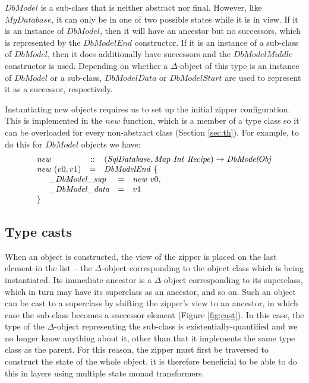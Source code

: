 $\mathit{DbModel}$ is a sub-class that is neither abstract nor final. However, like $\mathit{MyDatabase}$, it can only be in one of two possible states while it is in view. If it is an instance of $\mathit{DbModel}$, then it will have an ancestor but no successors, which is represented by the $\mathit{DbModelEnd}$ constructor. If it is an instance of a sub-class of $\mathit{DbModel}$, then it does additionally have successors and the $\mathit{DbModelMiddle}$ constructor is used. Depending on whether a $\Delta$-object of this type is an instance of $\mathit{DbModel}$ or a sub-class, $\mathit{DbModelData}$ or $\mathit{DbModelStart}$ are used to represent it as a successor, respectively.

Instantiating new objects requires us to set up the initial zipper configuration. This is implemented in the $\mathit{new}$ function, which is a member of a type class so it can be overloaded for every non-abstract class (Section \ref{sec:th}). For example, to do this for $\mathit{DbModel}$ objects we have:
\begin{displaymath}
\begin{array}{lcl}
\mathit{new} & :: & (\mathit{SqlDatabase}, \mathit{Map}~\mathit{Int}~\mathit{Recipe}) \to 
\mathit{DbModelObj} \\
\mathit{new}~(v0,v1) & = & \mathit{DbModelEnd}~\{ \\
\multicolumn{3}{l}{\quad \begin{array}{lcl}
    \_\mathit{DbModel}\_\mathit{sup} & = & \mathit{new}~v0, \\
    \_\mathit{DbModel}\_\mathit{data} & = & v1
    \end{array}} \\
    \}&&
\end{array}
\end{displaymath}

\subsection{Type casts}

When an object is constructed, the view of the zipper is placed on the last element in the list -- the $\Delta$-object corresponding to the object class which is being instantiated. Its immediate ancestor is a $\Delta$-object corresponding to its superclass, which in turn may have its superclass as an ancestor, and so on. Such an object can be cast to a superclass by shifting the zipper's view to an ancestor, in which case the sub-class becomes a successor element (Figure \ref{fig:cast}). In this case, the type of the $\Delta$-object representing the sub-class is existentially-quantified and we no longer know anything about it, other than that it implements the same type class as the parent. For this reason, the zipper must first be traversed to construct the state of the whole object. it is therefore beneficial to be able to do this in layers using multiple state monad transformers.

